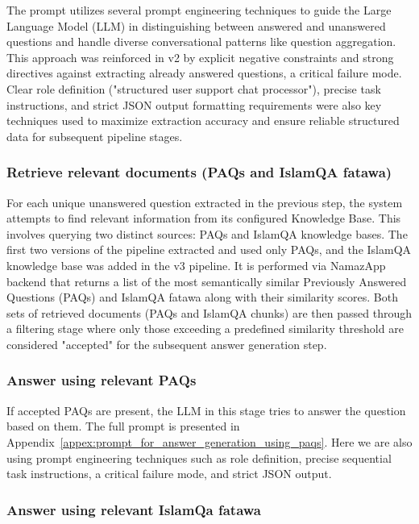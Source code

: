 The prompt utilizes several prompt engineering techniques to guide the Large Language Model (LLM) in distinguishing between answered and unanswered questions and handle diverse conversational patterns like question aggregation. This approach was reinforced in v2 by explicit negative constraints and strong directives against extracting already answered questions, a critical failure mode. Clear role definition ("structured user support chat processor"), precise task instructions, and strict JSON output formatting requirements were also key techniques used to maximize extraction accuracy and ensure reliable structured data for subsequent pipeline stages.

\subsubsection{Retrieve relevant documents (PAQs and IslamQA fatawa)}

For each unique unanswered question extracted in the previous step, the system attempts to find relevant information from its configured Knowledge Base. This involves querying two distinct sources: PAQs and IslamQA knowledge bases. The first two versions of the pipeline extracted and used only PAQs, and the IslamQA knowledge base was added in the v3 pipeline. It is performed via NamazApp backend that returns a list of the most semantically similar Previously Answered Questions (PAQs) and IslamQA fatawa along with their similarity scores.
Both sets of retrieved documents (PAQs and IslamQA chunks) are then passed through a filtering stage where only those exceeding a predefined similarity threshold are considered "accepted" for the subsequent answer generation step.

\subsubsection{Answer using relevant PAQs}

If accepted PAQs are present, the LLM in this stage tries to answer the question based on them. The full prompt is presented in Appendix~\ref{appex:prompt_for_answer_generation_using_paqs}. Here we are also using prompt engineering techniques such as role definition, precise sequential task instructions, a critical failure mode, and strict JSON output.

\subsubsection{Answer using relevant IslamQa fatawa}

